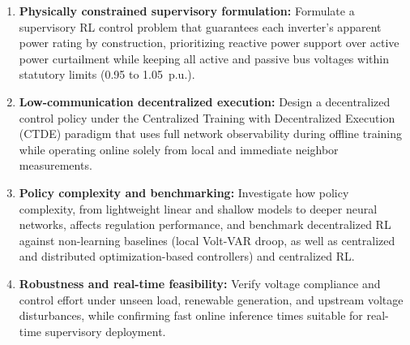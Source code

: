 \begin{enumerate}[itemsep=4pt, topsep=4pt]
    \item \textbf{Physically constrained supervisory formulation:} Formulate a supervisory RL control problem that guarantees each inverter's apparent power rating by construction, prioritizing reactive power support over active power curtailment while keeping all active and passive bus voltages within statutory limits (0.95 to 1.05~p.u.).

    \item \textbf{Low-communication decentralized execution:} Design a decentralized control policy under the Centralized Training with Decentralized Execution (CTDE) paradigm that uses full network observability during offline training while operating online solely from local and immediate neighbor measurements.

    \item \textbf{Policy complexity and benchmarking:} Investigate how policy complexity, from lightweight linear and shallow models to deeper neural networks, affects regulation performance, and benchmark decentralized RL against non-learning baselines (local Volt-VAR droop, as well as centralized and distributed optimization-based controllers) and centralized RL.

    \item \textbf{Robustness and real-time feasibility:} Verify voltage compliance and control effort under unseen load, renewable generation, and upstream voltage disturbances, while confirming fast online inference times suitable for real-time supervisory deployment.
\end{enumerate}
